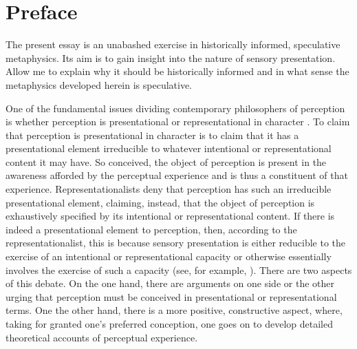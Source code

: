 \chapter*{Preface} %
\label{cha:preface}

The present essay is an unabashed exercise in historically informed, speculative metaphysics. Its aim is to gain insight into the nature of sensory presentation. Allow me to explain why it should be historically informed and in what sense the metaphysics developed herein is speculative.

One of the fundamental issues dividing contemporary philosophers of perception is whether perception is presentational or representational in character \citep[see, for example, the recent collection devoted to this topic][]{Brogaard:2014af}. To claim that perception is presentational in character is to claim that it has a presentational element irreducible to whatever intentional or representational content it may have. So conceived, the object of perception is present in the awareness afforded by the perceptual experience and is thus a constituent of that experience. Representationalists deny that perception has such an irreducible presentational element, claiming, instead, that the object of perception is exhaustively specified by its intentional or representational content. If there is indeed a presentational element to perception, then, according to the representationalist, this is because sensory presentation is either reducible to the exercise of an intentional or representational capacity or otherwise essentially involves the exercise of such a capacity (see, for example, \citealt{McDowell:2008fk,Searle:2015fu}). There are two aspects of this debate. On the one hand, there are arguments on one side or the other urging that perception must be conceived in presentational or representational terms. One the other hand, there is a more positive, constructive aspect, where, taking for granted one's preferred conception, one goes on to develop detailed theoretical accounts of perceptual experience. 


